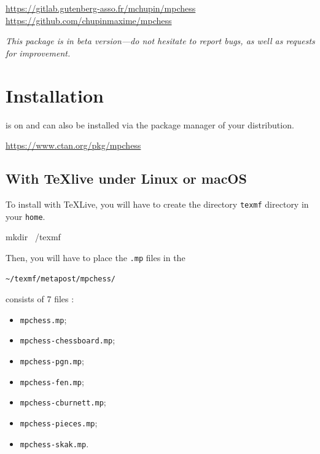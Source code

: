 \documentclass[english]{ltxdoc}
\begin{document}
\begin{center}
  \url{https://gitlab.gutenberg-asso.fr/mchupin/mpchess}
  \url{https://github.com/chupinmaxime/mpchess}
\end{center}

\tableofcontents

\bigskip

\begin{tcolorbox}[ arc=0pt,outer arc=0pt,
  colback=darkred!3,
  colframe=darkred,
  breakable,
  boxsep=0pt,left=5pt,right=5pt,top=5pt,bottom=5pt, bottomtitle =
  3pt, toptitle=3pt,
  boxrule=0pt,bottomrule=0.5pt,toprule=0.5pt, toprule at break =
  0pt, bottomrule at break = 0pt,]
  \itshape
  This package is in beta version---do not hesitate to report bugs, as well as requests for improvement.
\end{tcolorbox}

\section{Installation}

\mpchess is on \ctan{} and can also be installed via the package manager of your
distribution.

\begin{center}
  \url{https://www.ctan.org/pkg/mpchess}
\end{center}


\subsection{With \TeX live under Linux or macOS}

To install \mpchess with \TeX Live, you will have to create the directory
\lstinline+texmf+ directory in your \lstinline+home+. 

\begin{commandshell}
mkdir ~/texmf
\end{commandshell}

Then, you will have to place the \lstinline+.mp+ files in the 
\begin{center}
  \lstinline+~/texmf/metapost/mpchess/+
\end{center}

\mpchess consists of 7 files  :
\begin{itemize}
  \item \verb+mpchess.mp+;
  \item \verb+mpchess-chessboard.mp+;
  \item \verb+mpchess-pgn.mp+;
  \item \verb+mpchess-fen.mp+;
  \item \verb+mpchess-cburnett.mp+;
  \item \verb+mpchess-pieces.mp+;
  \item \verb+mpchess-skak.mp+.
\end{itemize}
\end{document}
